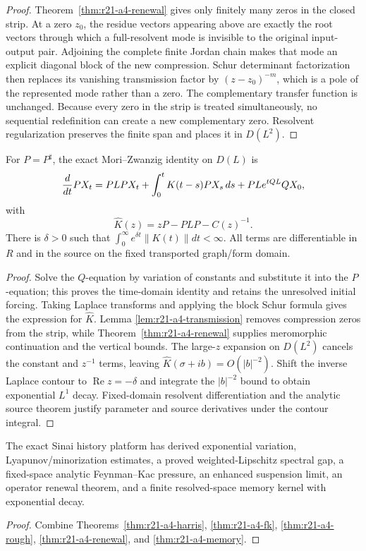 \begin{proof}
Theorem~\ref{thm:r21-a4-renewal} gives only finitely many zeros in the closed
strip.  At a zero $z_0$, the residue vectors appearing above are exactly the
root vectors through which a full-resolvent mode is invisible to the original
input-output pair.  Adjoining the complete finite Jordan chain makes that
mode an explicit diagonal block of the new compression.  Schur determinant
factorization then replaces its vanishing transmission factor by
$(z-z_0)^{-m}$, which is a pole of the represented mode rather than a zero.
The complementary transfer function is unchanged.  Because every zero in the
strip is treated simultaneously, no sequential redefinition can create a new
complementary zero.  Resolvent regularization preserves the finite span and
places it in $D(L^2)$.
\end{proof}

\begin{theorem}
\label{thm:r21-a4-memory}
For $P=P^\sharp$, the exact Mori--Zwanzig identity on $D(L)$ is
\[
 {d\over dt}PX_t=PLPX_t+
 \int_0^tK(t-s)PX_s\,ds+PL e^{tQL}QX_0,
\]
with
\[
 \widehat K(z)=zP-PLP-C(z)^{-1}.
\]
There is $\delta>0$ such that
$\int_0^\infty e^{\delta t}\|K(t)\|dt<\infty$.  All terms are differentiable
in $R$ and in the source on the fixed transported graph/form domain.
\end{theorem}

\begin{proof}
Solve the $Q$-equation by variation of constants and substitute it into the
$P$-equation; this proves the time-domain identity and retains the unresolved
initial forcing.  Taking Laplace transforms and applying the block Schur
formula gives the expression for $\widehat K$.  Lemma
\ref{lem:r21-a4-transmission} removes compression zeros from the strip, while
Theorem~\ref{thm:r21-a4-renewal} supplies meromorphic continuation and the
vertical bounds.  The large-$z$ expansion on $D(L^2)$ cancels the constant and
$z^{-1}$ terms, leaving $\widehat K(\sigma+ib)=O(|b|^{-2})$.  Shift the inverse
Laplace contour to $\operatorname{Re}z=-\delta$ and integrate the
$|b|^{-2}$ bound to obtain exponential $L^1$ decay.  Fixed-domain resolvent
differentiation and the analytic source theorem justify parameter and source
derivatives under the contour integral.
\end{proof}

\begin{theorem}
\label{thm:r21-a4-main}
The exact Sinai history platform has derived exponential variation,
Lyapunov/minorization estimates, a proved weighted-Lipschitz spectral gap, a
fixed-space analytic Feynman--Kac pressure, an enhanced suspension limit, an
operator renewal theorem, and a finite resolved-space memory kernel with
exponential decay.
\end{theorem}

\begin{proof}
Combine Theorems~\ref{thm:r21-a4-harris},
\ref{thm:r21-a4-fk}, \ref{thm:r21-a4-rough},
\ref{thm:r21-a4-renewal}, and \ref{thm:r21-a4-memory}.
\end{proof}
